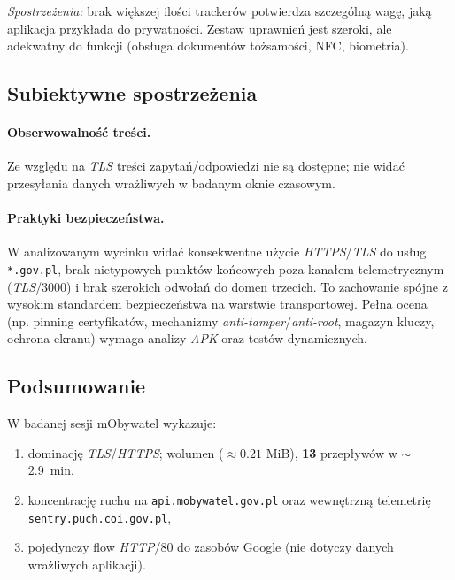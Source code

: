 \emph{Spostrzeżenia:} brak większej ilości trackerów potwierdza szczególną wagę, jaką aplikacja przykłada do prywatności. Zestaw uprawnień jest szeroki, ale adekwatny do funkcji (obsługa dokumentów tożsamości, NFC, biometria).

\subsection{Subiektywne spostrzeżenia}
\paragraph{Obserwowalność treści.} 
Ze względu na \emph{TLS} treści zapytań/odpowiedzi nie są dostępne; nie widać przesyłania danych wrażliwych w badanym oknie czasowym.

\paragraph{Praktyki bezpieczeństwa.}
W analizowanym wycinku widać konsekwentne użycie \emph{HTTPS}/\emph{TLS} do usług \texttt{*.gov.pl}, brak nietypowych punktów końcowych poza kanałem telemetrycznym (\emph{TLS}/3000) i brak szerokich odwołań do domen trzecich. To zachowanie spójne z wysokim standardem bezpieczeństwa na warstwie transportowej. Pełna ocena (np. pinning certyfikatów, mechanizmy \emph{anti-tamper}/\emph{anti-root}, magazyn kluczy, ochrona ekranu) wymaga analizy \emph{APK} oraz testów dynamicznych.

\subsection{Podsumowanie}
W badanej sesji mObywatel wykazuje:
\begin{enumerate}
\item dominację \emph{TLS}/\emph{HTTPS}; wolumen ($\approx 0.21$ MiB), \textbf{13} przepływów w $\sim$\SI{2.9}{\minute},
\item koncentrację ruchu na \texttt{api.mobywatel.gov.pl} oraz wewnętrzną telemetrię \texttt{sentry.puch.coi.gov.pl},
\item pojedynczy flow \emph{HTTP}/80 do zasobów Google (nie dotyczy danych wrażliwych aplikacji).
\end{enumerate}
